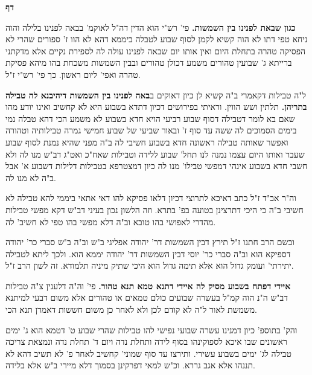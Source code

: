 \documentclass[12pt, openany]{book}
\newcommand{\sethebfont}{
\fontsize{10.5pt}{21.0pt} \selectfont
}
\newcommand{\twocol}[1]{
	{\sethebfont \begin{multicols}{2}
			#1
	\end{multicols}}	
}
\newcommand{\chapname}{}
\newcommand{\newchap}[1]{
	\addcontentsline{toc}{chapter}{#1}
	\renewcommand{\chapname}{#1}
		\begin{center}
			\textbf{%
\fontsize{16pt}{16pt}\selectfont
				#1}
		\end{center}
}
\begin{document}
\newchap{דף }
\twocol{\textbf{כגון שבאת לפנינו בין השמשות.}  פי' רש"י הוא הדין דה"ל לאוקמ' בבאה לפנינו בלילה והוה ניחא טפי דתו לא הוה קשיא לקמן לסוף שבוע לטבלה ביממא דהא לא הוו ז' ספורים שהרי לא הפסיקה טהרה בתחלת היום ואין אותו יום שבאה לפנינו עולה לה לספירת נקיים אלא מדקתני ברייתא ג' שבועין טהורים משמע דכולן טהורים ובבין השמשות משכחת בהו מיהא פסיקת טהרה ואפי' ליום ראשון. כך פי' רש"י ז"ל. 
\par ל"ה טבילות דקאמרי ב"ה קשיא לן כיון דאוקים ב\textbf{באה לפנינו בין השמשות דיהיבנא לה טבילה בתריהן.}  תלתין ושש הווין. וראיתי בפירושים דכיון דתדא בשבוע היא לא קחשיב ואינו יודע מהו שאם בא לומר דטבילה דסוף שבוע רביעי הויא חדא בשבוע לא משמע הכי דהא טבלה נמי בימים הסמוכים לה ששה עד סוף ז' ובאור שביעי של שבוע חמישי גמרה טבילותיה וטהורה ואפשר שאותה טבילה ראשונה חדא בשבוע חשיבי לה ב"ה מפני שהיא נמנת לסוף שבוע שעבר ואותו היום עצמו נמנה לנו תחל' שבוע ללידה וטבילות שאח"כ ואט"ג דב"ש מנו לה ולא חשבי חדא בשבוע אינהי דמפשי טבילו' מנו לה כיון דמצטרפא בטבילות דלילות דשבוע א' אבל ב"ה לא מנו לה.\par  וה"ר אב"ד ז"ל כתב דאיכא לתרוצי דכיון דלאו פסיקא להו דאי אתאי ביממי להא טבילה לא חשיבי ב"ה כי היכי דתרצינן בטועה בפ' בתרא. וזה הלשון נכון בעיני דב"ש דקא מפשי טבילות מהדרי לאפושי בהו טובא וב"ה דלא מפשי בהו טפי לא חשיב' לה.\par  ובשם הרב חתנו ז"ל תירץ דבין השמשות דר' יהודה אפליגי ב"ש וב"ה ב"ש סברי כר' יהודה דספיקא הוא וב"ה סברי כר' יוסי דבין השמשות דר' יהודה יממא הוא. ולכך ליתא לטבילה יתירתי' ועומק גדול הוא אלא תימה גדול הוא היכי שתיק מיניה תלמודא. זה לשון הרב ז"ל. 
\par\textbf{איידי דפתח בשבוע מסיק לה איידי דתנא טמא תנא טהור.}  פי' וה"ה דלענין צ"ה טבילות דב"ש ה"נ הוה קמ"ל בעשרה שבועים כולם טמאים או טהורים אלא משום דבעי למיתנא משמשת לאור ל"ה לא קודם לכן ולא לאחר כן משום חששות דאמרן תנא הכי.\par והק' בתוספ' כיון דמנינו עשרה שבועי נפישי להו טבילות שהרי שבוע ט' דטמא הוא ג' ימים ראשונים שבו איכא לספוקינהו בסוף לידה ותחלת נדה ויום ד' תחלת נדה ונמצאת צריכה טבילה לג' ימים בשבוע עשירי. ותירצו עד סוף שמוני' קחשיב לאחר פ' לא תשיב דהא לא תננהו אלא אגב גררא. וכ"ש למאי דפרקינן בסמוך דלא מיירי ב"ש אלא בלידה. 
}
\end{document}
